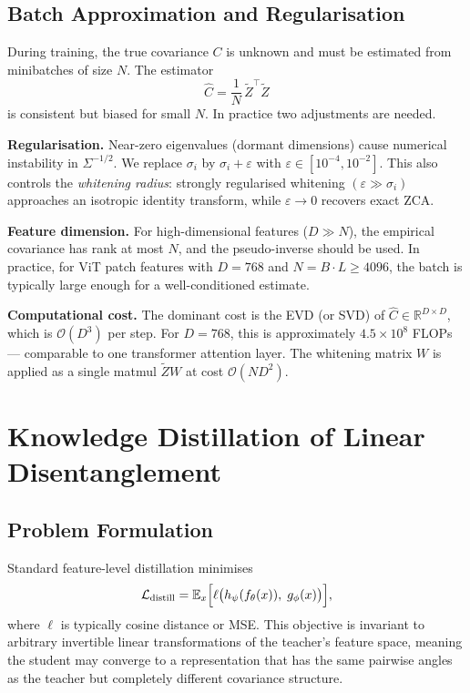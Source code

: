 \documentclass[11pt,a4paper]{article}
\newcommand{\R}{\mathbb{R}}
\newcommand{\E}{\mathbb{E}}
\newcommand{\calL}{\mathcal{L}}
\begin{document}
\subsection{Batch Approximation and Regularisation}
\label{sec:batch_zca}

During training, the true covariance $C$ is unknown and must be estimated from
minibatches of size $N$.  The estimator
\[
    \hat{C} = \frac{1}{N}\, \tilde{Z}^\top \tilde{Z}
\]
is consistent but biased for small $N$.  In practice two adjustments are needed.

\textbf{Regularisation.}\; Near-zero eigenvalues (dormant dimensions) cause
numerical instability in $\Sigma^{-1/2}$.  We replace $\sigma_i$ by
$\sigma_i + \varepsilon$ with $\varepsilon \in [10^{-4}, 10^{-2}]$.
This also controls the \emph{whitening radius}: strongly regularised whitening
$({\varepsilon} \gg \sigma_i)$ approaches an isotropic identity transform, while
$\varepsilon \to 0$ recovers exact ZCA.

\textbf{Feature dimension.}\; For high-dimensional features ($D \gg N$), the
empirical covariance has rank at most $N$, and the pseudo-inverse should be used.
In practice, for ViT patch features with $D = 768$ and $N = B \cdot L \ge 4096$,
the batch is typically large enough for a well-conditioned estimate.

\textbf{Computational cost.}\; The dominant cost is the EVD (or SVD) of
$\hat{C} \in \R^{D \times D}$, which is $\mathcal{O}(D^3)$ per step.  For
$D = 768$, this is approximately $4.5 \times 10^8$ FLOPs — comparable to one
transformer attention layer.  The whitening matrix $W$ is applied as a
single matmul $\tilde{Z} W$ at cost $\mathcal{O}(ND^2)$.

\section{Knowledge Distillation of Linear Disentanglement}
\label{sec:distillation}

\subsection{Problem Formulation}
\label{sec:formulation}

Standard feature-level distillation minimises
\[
    \calL_{\mathrm{distill}}
    = \E_{x}\Bigl[\ell\bigl(h_\psi(f_\theta(x)),\; g_\phi(x)\bigr)\Bigr],
\]
where $\ell$ is typically cosine distance or MSE.
This objective is invariant to arbitrary invertible linear transformations of
the teacher's feature space, meaning the student may converge to a
representation that has the same pairwise angles as the teacher but completely
different covariance structure.
\end{document}
